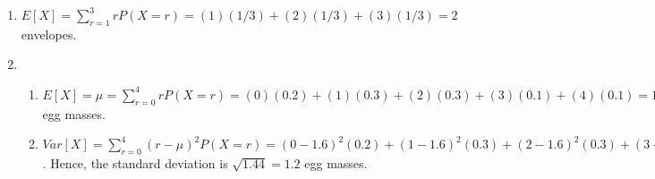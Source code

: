 \documentclass{article}\usepackage[]{graphicx}\usepackage[]{color}
\makeatletter
\newcommand{\hlnum}[1]{\textcolor[rgb]{0.686,0.059,0.569}{#1}}%
\newcommand{\hlopt}[1]{\textcolor[rgb]{0,0,0}{#1}}%
\newcommand{\hlstd}[1]{\textcolor[rgb]{0.345,0.345,0.345}{#1}}%
\newcommand{\hlkwc}[1]{\textcolor[rgb]{0.333,0.667,0.333}{#1}}%
\newcommand{\hlkwd}[1]{\textcolor[rgb]{0.737,0.353,0.396}{\textbf{#1}}}%
\newenvironment{kframe}{%
 \def\at@end@of@kframe{}%
 \ifinner\ifhmode%
  \def\at@end@of@kframe{\end{minipage}}%
  \begin{minipage}{\columnwidth}%
 \fi\fi%
 \def\FrameCommand##1{\hskip\@totalleftmargin \hskip-\fboxsep
 \colorbox{shadecolor}{##1}\hskip-\fboxsep
     \hskip-\linewidth \hskip-\@totalleftmargin \hskip\columnwidth}%
 \MakeFramed {\advance\hsize-\width
   \@totalleftmargin\z@ \linewidth\hsize
   \@setminipage}}%
 {\par\unskip\endMakeFramed%
 \at@end@of@kframe}
\newenvironment{knitrout}{}{} %
\makeatother
\begin{document}
\begin{enumerate}
\begin{enumerate}
    \item The standard deviation is $\sigma = \sqrt{np\left(1 - p\right)} = \sqrt{(50)(0.2)(0.8)} = 2.828427$ and the mean/expected value is $\mu = np = (50)(0.2) = 10$. Hence, the $z$-score is $\left(19 - 10\right) / 2.828427 \approx 3.181981$ which implies that 19 is a little over three standard deviations above the mean.
    
    \item Using the empirical rule, we have that $P\left(X \ge 19\right) \approx P\left(X \ge \mu + 3\sigma\right) \approx \left(1 - 0.997\right) / 2 = 0.003 / 2 = 0.0015$. (Draw a picture!). The exact answer is 
\begin{knitrout}
\color{fgcolor}\begin{kframe}
\begin{alltt}
\hlnum{1} \hlopt{-} \hlkwd{pbinom}\hlstd{(}\hlnum{18}\hlstd{,} \hlkwc{size} \hlstd{=} \hlnum{50}\hlstd{,} \hlkwc{prob} \hlstd{=} \hlnum{0.2}\hlstd{)}
\end{alltt}
\begin{verbatim}
## [1] 0.002511203
\end{verbatim}
\end{kframe}
\end{knitrout}
    
  \end{enumerate}
  
  \item $E\left[X\right] = \sum_{r = 1}^3 rP\left(X = r\right) = (1)\left(1/3\right) + (2)\left(1/3\right) + (3)\left(1/3\right) = 2$ envelopes.
  
  \item 
  
  \begin{enumerate}
  
    \item $E\left[X\right] = \mu = \sum_{r = 0}^4 rP\left(X = r\right) = (0)(0.2) + (1)(0.3) + (2)(0.3) + (3)(0.1) + (4)(0.1) = 1.6$ egg masses.
    
    \item $Var\left[X\right] = \sum_{r = 0}^4 \left(r - \mu\right) ^ 2 P\left(X = r\right) = \left(0 - 1.6\right)^2(0.2) + \left(1 - 1.6\right)^2(0.3) + \left(2 - 1.6\right)^2(0.3) + \left(3 - 1.6\right)^2(0.1) + \left(4 - 1.6\right)^2(0.1) = 1.44$. Hence, the standard deviation is $\sqrt{1.44} = 1.2$ egg masses.
  
  \end{enumerate}
  

\end{enumerate}
\end{document}
